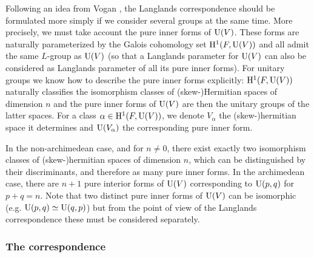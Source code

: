 Following an idea from Vogan \cite{vogan1993local}, the Langlands correspondence should be formulated more simply if we consider several groups at the same time.
More precisely, we must take account the pure inner forms of $\mathrm{U}(V)$.
These forms are naturally parameterized by the Galois cohomology set $\mathrm{H}^1(F, \mathrm{U}(V))$ and all admit the same $L$-group as $\mathrm{U}(V)$ (so that a Langlands parameter for $\mathrm{U}(V)$ can also be considered as Langlands parameter of all its pure inner forms).
For unitary groups we know how to describe the pure inner forms explicitly: $\mathrm{H}^1(F, \mathrm{U}(V))$ naturally classifies the isomorphism classes of (skew-)Hermitian spaces of dimension $n$ and the pure inner forms of $\mathrm{U}(V)$ are then the unitary groups of the latter spaces.
For a class $\alpha \in \mathrm{H}^1(F, \mathrm{U}(V))$, we denote $V_\alpha$ the (skew-)hermitian space it determines and $\mathrm{U}(V_\alpha)$ the corresponding pure inner form.

In the non-archimedean case, and for $n \neq 0$, there exist exactly two isomorphism classes of (skew-)hermitian spaces of dimension $n$, which can be distinguished by their discriminants, and therefore as many pure inner forms.
In the archimedean case, there are $n+1$ pure interior forms of $\mathrm{U}(V)$ corresponding to $\mathrm{U}(p, q)$ for $p + q = n$.
Note that two distinct pure inner forms of $\mathrm{U}(V)$ can be isomorphic (e.g. $\mathrm{U}(p, q) \simeq \mathrm{U}(q,p)$) but from the point of view of the Langlands correspondence these must be considered separately.


\subsubsection{The correspondence}

